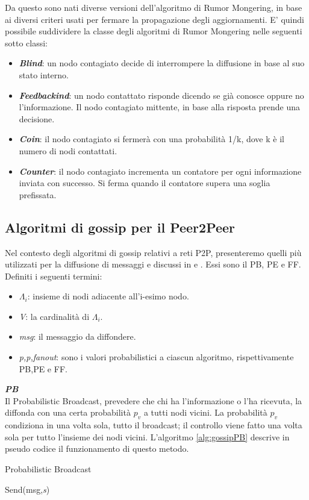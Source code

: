 Da questo sono nati diverse versioni dell'algoritmo di Rumor Mongering, in base ai diversi criteri usati per fermare la propagazione degli aggiornamenti. E' quindi possibile suddividere la classe degli algoritmi di Rumor Mongering nelle seguenti sotto classi:
\begin{itemize}
	\item \textbf{\textit{Blind}}: un nodo contagiato decide di interrompere la diffusione in base al suo stato interno.
	\item \textbf{\textit{Feedbackind}}: un nodo contattato risponde dicendo se già conosce oppure no l'informazione. Il nodo contagiato mittente, in base alla risposta prende una decisione.
	\item \textbf{\textit{Coin}}: il nodo contagiato si fermerà con una probabilità 1/k, dove k è il numero di nodi contattati.
	\item \textbf{\textit{Counter}}: il nodo contagiato incrementa un contatore per ogni informazione inviata con successo. Si ferma quando il contatore supera una soglia prefissata.
\end{itemize}

\subsection{Algoritmi di gossip per il Peer2Peer}
\label{subsec:alg_p2p}
Nel contesto degli algoritmi di gossip relativi a reti \acs{P2P}, presenteremo quelli più utilizzati per la diffusione di messaggi e discussi in \cite{comparisonGAonRT2012} e \cite{comparisonGAonRT2014-ita}. Essi sono il \acf{PB}, \acf{PE} e \acf{FF}. Definiti i seguenti termini:
\begin{itemize}
	\item $ \varLambda_{i} $: insieme di nodi adiacente all'i-esimo nodo.
	\item \textit{V}: la cardinalità di $ \Lambda_{i} $.
	\item \textit{msg}: il messaggio da diffondere.
	\item \textit{p,p,fanout}: sono i valori probabilistici a ciascun algoritmo, rispettivamente PB,PE e FF.
\end{itemize}
\bigskip

\noindent\textbf{\textit{\acf{PB}}}\\
Il Probabilistic Broadcast, prevedere che chi ha l'informazione o l'ha ricevuta, la diffonda con una certa probabilità $\mathit{p_v}$ a tutti nodi vicini. La probabilità $\mathit{p_v}$ condiziona in una volta sola, tutto il broadcast; il controllo viene fatto una volta sola per tutto l'insieme dei nodi vicini. L'algoritmo \ref{alg:gossipPB} descrive in pseudo codice il funzionamento di questo metodo.
\bigskip
\begin{algorithm}[h]
	\caption{Probabilistic Broadcast}\label{alg:gossipPB}
	\begin{algorithmic}[1]
					\State Send(msg,\emph{s})
				\EndFor
			\EndIf
		\EndFunction
	\end{algorithmic}
\end{algorithm}
\bigskip

